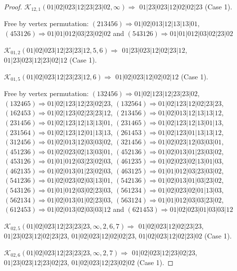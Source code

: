 \documentclass[12pt]{article}
\theoremstyle{plain}
\theoremstyle{definition}
\theoremstyle{remark}
\newcommand{\fancy}[1]{\mathcal{#1}}
\def\K{\fancy{K}}
\begin{document}
\begin{proof}
	$\K_{12,1}(01|02|023|12|23|23|02,\infty)\Rightarrow $ $01|23|023|12|02|02|23$ (Case 1).
	
	
	
	Free by vertex permutation: $(2 1 3 4 5 6)\Rightarrow 01|02|013|12|13|13|01$, $(4 5 3 1 2 6)\Rightarrow 01|01|012|03|23|02|02$ and $(5 4 3 1 2 6)\Rightarrow 01|01|012|03|02|23|02$
	
	
	
	\bigskip
	
	$\K_{01,2}(01|02|023|12|23|23|12,5, 6)\Rightarrow $ $01|23|023|12|02|23|12$, $01|23|023|12|23|02|12$ (Case 1).
	
	$\K_{01,5}(01|02|023|12|23|23|12,6)\Rightarrow $ $01|02|023|12|02|02|12$ (Case 1).
	
	
	
	Free by vertex permutation: $(1 3 2 4 5 6)\Rightarrow 01|02|123|12|23|23|02$, $(1 3 2 4 6 5)\Rightarrow 01|02|123|12|23|02|23$, $(1 3 2 5 6 4)\Rightarrow 01|02|123|12|02|23|23$, $(1 6 2 4 5 3)\Rightarrow 01|02|123|02|23|23|12$, $(2 1 3 4 5 6)\Rightarrow 01|02|013|12|13|13|12$, $(2 3 1 4 5 6)\Rightarrow 01|02|123|12|13|13|01$, $(2 3 1 4 6 5)\Rightarrow 01|02|123|12|13|01|13$, $(2 3 1 5 6 4)\Rightarrow 01|02|123|12|01|13|13$, $(2 6 1 4 5 3)\Rightarrow 01|02|123|01|13|13|12$, $(3 1 2 4 5 6)\Rightarrow 01|02|013|12|03|03|02$, $(3 2 1 4 5 6)\Rightarrow 01|02|023|12|03|03|01$, $(4 5 1 2 3 6)\Rightarrow 01|02|023|02|13|03|01$, $(4 5 2 1 3 6)\Rightarrow 01|02|013|01|23|03|02$, $(4 5 3 1 2 6)\Rightarrow 01|01|012|03|23|02|03$, $(4 6 1 2 3 5)\Rightarrow 01|02|023|02|13|01|03$, $(4 6 2 1 3 5)\Rightarrow 01|02|013|01|23|02|03$, $(4 6 3 1 2 5)\Rightarrow 01|01|012|03|23|03|02$, $(5 4 1 2 3 6)\Rightarrow 01|02|023|02|03|13|01$, $(5 4 2 1 3 6)\Rightarrow 01|02|013|01|03|23|02$, $(5 4 3 1 2 6)\Rightarrow 01|01|012|03|02|23|03$, $(5 6 1 2 3 4)\Rightarrow 01|02|023|02|01|13|03$, $(5 6 2 1 3 4)\Rightarrow 01|02|013|01|02|23|03$, $(5 6 3 1 2 4)\Rightarrow 01|01|012|03|03|23|02$, $(6 1 2 4 5 3)\Rightarrow 01|02|013|02|03|03|12$ and $(6 2 1 4 5 3)\Rightarrow 01|02|023|01|03|03|12$
	
	
	
	\bigskip
	
	$\K_{02,5}(01|02|023|12|23|23|23,\infty,2, 6, 7)\Rightarrow $ $01|02|023|12|02|23|23$, $01|23|023|12|02|23|23$, $01|02|023|12|02|02|23$, $01|02|023|12|02|23|02$ (Case 1).
	
	$\K_{02,6}(01|02|023|12|23|23|23,\infty,2, 7)\Rightarrow $ $01|02|023|12|23|02|23$, $01|23|023|12|23|02|23$, $01|02|023|12|23|02|02$ (Case 1).
	

\end{proof}
\end{document}
